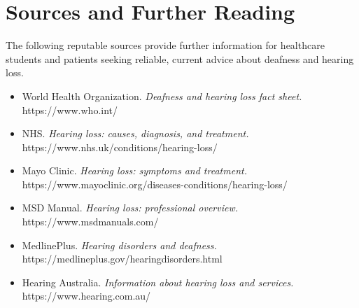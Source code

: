 \section*{Sources and Further Reading}
The following reputable sources provide further information for healthcare students and patients seeking reliable, current advice about deafness and hearing loss.

\begin{itemize}
    \item World Health Organization. \textit{Deafness and hearing loss fact sheet.} https://www.who.int/
    \item NHS. \textit{Hearing loss: causes, diagnosis, and treatment.} https://www.nhs.uk/conditions/hearing-loss/
    \item Mayo Clinic. \textit{Hearing loss: symptoms and treatment.} https://www.mayoclinic.org/diseases-conditions/hearing-loss/
    \item MSD Manual. \textit{Hearing loss: professional overview.} https://www.msdmanuals.com/
    \item MedlinePlus. \textit{Hearing disorders and deafness.} https://medlineplus.gov/hearingdisorders.html
    \item Hearing Australia. \textit{Information about hearing loss and services.} https://www.hearing.com.au/
\end{itemize}
